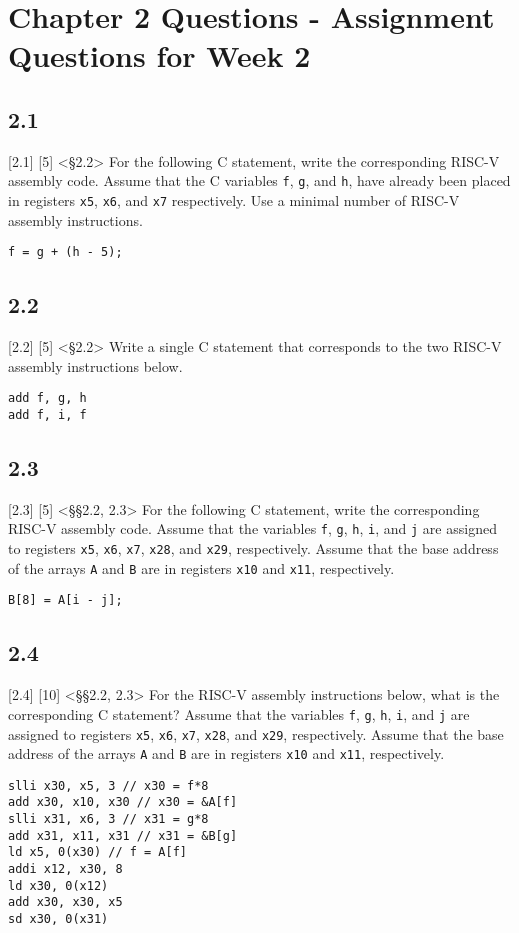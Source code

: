 \documentclass[11pt]{article}
\begin{document}
\section*{Chapter 2 Questions - Assignment Questions for Week 2}

\subsection*{2.1}
[2.1] [5] <§2.2> For the following C statement, write the corresponding RISC-V 
assembly code. Assume that the C variables \texttt{f}, \texttt{g}, and \texttt{h}, have already been placed 
in registers \texttt{x5}, \texttt{x6}, and \texttt{x7} respectively. Use a minimal number of RISC-V assembly 
instructions.
\begin{verbatim}
f = g + (h - 5);
\end{verbatim}

\subsection*{2.2}
[2.2] [5] <§2.2> Write a single C statement that corresponds to the two RISC-V 
assembly instructions below.
\begin{verbatim}
add f, g, h
add f, i, f
\end{verbatim}

\subsection*{2.3}
[2.3] [5] <§§2.2, 2.3> For the following C statement, write the corresponding 
RISC-V assembly code. Assume that the variables \texttt{f}, \texttt{g}, \texttt{h}, \texttt{i}, and \texttt{j} are assigned to 
registers \texttt{x5}, \texttt{x6}, \texttt{x7}, \texttt{x28}, and \texttt{x29}, respectively. Assume that the base address 
of the arrays \texttt{A} and \texttt{B} are in registers \texttt{x10} and \texttt{x11}, respectively.
\begin{verbatim}
B[8] = A[i - j];
\end{verbatim}

\subsection*{2.4}
[2.4] [10] <§§2.2, 2.3> For the RISC-V assembly instructions below, what is the 
corresponding C statement? Assume that the variables \texttt{f}, \texttt{g}, \texttt{h}, \texttt{i}, and \texttt{j} are assigned 
to registers \texttt{x5}, \texttt{x6}, \texttt{x7}, \texttt{x28}, and \texttt{x29}, respectively. Assume that the base 
address of the arrays \texttt{A} and \texttt{B} are in registers \texttt{x10} and \texttt{x11}, respectively.
\begin{verbatim}
slli x30, x5, 3 // x30 = f*8
add x30, x10, x30 // x30 = &A[f]
slli x31, x6, 3 // x31 = g*8
add x31, x11, x31 // x31 = &B[g]
ld x5, 0(x30) // f = A[f]
addi x12, x30, 8
ld x30, 0(x12)
add x30, x30, x5
sd x30, 0(x31)
\end{verbatim}
\end{document}
